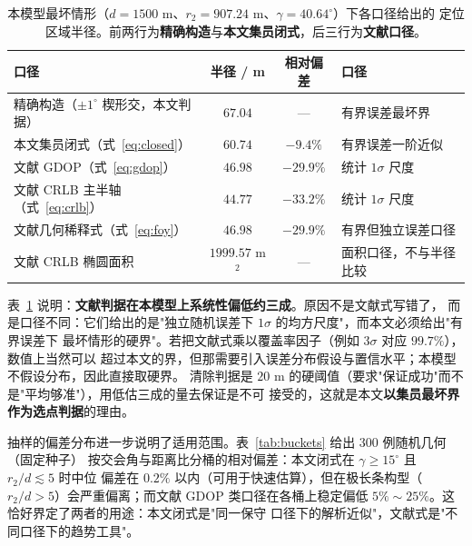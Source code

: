 \begin{table}[H]
  \centering
  \caption{本模型最坏情形（$d=1500$ m、$r_2=907.24$ m、$\gamma=40.64^\circ$）下各口径给出的
  定位区域半径。前两行为\textbf{精确构造}与\textbf{本文集员闭式}，后三行为\textbf{文献口径}。}
  \label{tab:criteria}
  \small
  \setlength{\tabcolsep}{5pt}
  \begin{tabular}{lccl}
    \toprule
    \textbf{口径} & \textbf{半径 / m} & \textbf{相对偏差} & \textbf{口径} \\
    \midrule
    精确构造（$\pm1^\circ$ 楔形交，本文判据） & $67.04$ & ---               & 有界误差最坏界 \\
    本文集员闭式（式~\eqref{eq:closed}）      & $60.74$ & $-9.4\%$          & 有界误差一阶近似 \\
    文献 GDOP（式~\eqref{eq:gdop}）          & $46.98$ & $-29.9\%$         & 统计 $1\sigma$ 尺度 \\
    文献 CRLB 主半轴（式~\eqref{eq:crlb}）   & $44.77$ & $-33.2\%$         & 统计 $1\sigma$ 尺度 \\
    文献几何稀释式（式~\eqref{eq:foy}）      & $46.98$ & $-29.9\%$         & 有界但独立误差口径 \\
    \midrule
    文献 CRLB 椭圆面积                       & $1999.57$ m$^2$ & ---     & 面积口径，不与半径比较 \\
    \bottomrule
  \end{tabular}
\end{table}

表~\ref{tab:criteria} 说明：\textbf{文献判据在本模型上系统性偏低约三成}。原因不是文献式写错了，
而是口径不同：它们给出的是"独立随机误差下 $1\sigma$ 的均方尺度"，而本文必须给出"有界误差下
最坏情形的硬界"。若把文献式乘以覆盖率因子（例如 $3\sigma$ 对应 $99.7\%$），数值上当然可以
超过本文的界，但那需要引入误差分布假设与置信水平；本模型不假设分布，因此直接取硬界。
清除判据是 $20$ m 的硬阈值（要求"保证成功"而不是"平均够准"），用低估三成的量去保证是不可
接受的，这就是本文\textbf{以集员最坏界作为选点判据}的理由。

抽样的偏差分布进一步说明了适用范围。表~\ref{tab:buckets} 给出 $300$ 例随机几何（固定种子）
按交会角与距离比分桶的相对偏差：本文闭式在 $\gamma\ge15^\circ$ 且 $r_2/d\lesssim5$ 时中位
偏差在 $0.2\%$ 以内（可用于快速估算），但在极长条构型（$r_2/d>5$）会严重偏离；而文献
GDOP 类口径在各桶上稳定偏低 $5\%\sim25\%$。这恰好界定了两者的用途：本文闭式是"同一保守
口径下的解析近似"，文献式是"不同口径下的趋势工具"。

